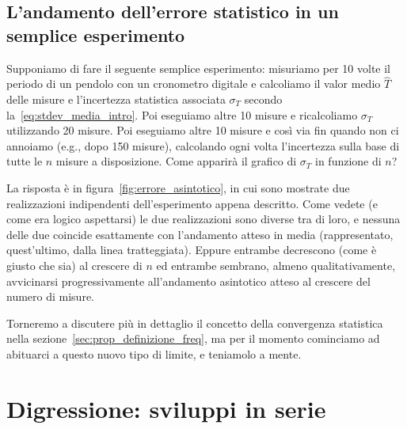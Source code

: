 \subsection{L'andamento dell'errore statistico in un semplice esperimento}

Supponiamo di fare il seguente semplice esperimento: misuriamo per 10 volte
il periodo di un pendolo con un cronometro digitale e calcoliamo il valor medio
$\hat{T}$ delle misure e l'incertezza statistica associata $\sigma_T$ secondo
la~\eqref{eq:stdev_media_intro}. Poi eseguiamo altre 10 misure e ricalcoliamo
$\sigma_T$ utilizzando 20 misure. Poi eseguiamo altre 10 misure e così via
fin quando non ci annoiamo (e.g., dopo 150 misure), calcolando ogni volta
l'incertezza sulla base di tutte le $n$ misure a disposizione.
Come apparirà il grafico di $\sigma_T$ in funzione di $n$?


La risposta è in figura~\ref{fig:errore_asintotico}, in cui sono mostrate
due realizzazioni indipendenti dell'esperimento appena descritto.
Come vedete (e come era logico aspettarsi) le due realizzazioni sono diverse
tra di loro, e nessuna delle due coincide esattamente con l'andamento atteso
in media (rappresentato, quest'ultimo, dalla linea tratteggiata). Eppure
entrambe decrescono (come è giusto che sia) al crescere di $n$ ed entrambe
sembrano, almeno qualitativamente, avvicinarsi progressivamente all'andamento
asintotico atteso al crescere del numero di misure.

Torneremo a discutere più in dettaglio il concetto della convergenza statistica
nella sezione~\ref{sec:prop_definizione_freq}, ma per il momento cominciamo ad
abituarci a questo nuovo tipo di limite, e teniamolo a mente.


\section{Digressione: sviluppi in serie}
\label{sec:sviluppi_in_serie}

